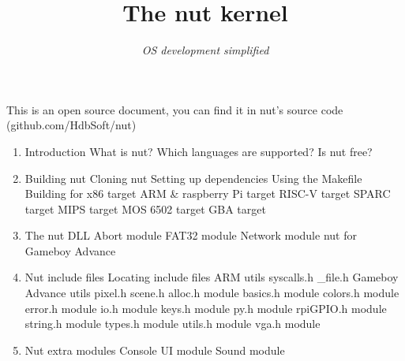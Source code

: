 \documentclass{article}
\title{The nut kernel}
\author{\textit{OS development simplified}}
\date{}
\begin{document}
  \maketitle
  \newpage
  \begin{center}
    This is an open source document, you can find it in nut's source code (github.com/HdbSoft/nut)
  \end{center}
  \newpage

  \begin{enumerate}
  	\Large \item Introduction
    \large \subitem What is nut?
    \large \subitem Which languages are supported?
    \large \subitem Is nut free?
  	\\
  	\Large \item Building nut
  	\large \subitem Cloning nut
    \large \subitem Setting up dependencies
    \large \subitem Using the Makefile
  	\large \subitem Building for x86 target
  	\large \subitem ARM \& raspberry Pi target
  	\large \subitem RISC-V target
  	\large \subitem SPARC target
  	\large \subitem MIPS target
  	\large \subitem MOS 6502 target
  	\large \subitem GBA target
    \\
  	\Large \item The nut DLL
  	\large \subitem Abort module
    \large \subitem FAT32 module
    \large \subitem Network module
    \large \subitem nut for Gameboy Advance
    \\
  	\Large \item Nut include files
    \large \subitem Locating include files
    \large \subitem ARM utils
    \normalsize \subitem \hspace{1cm} syscalls.h
    \normalsize \subitem \hspace{1cm} \_file.h
    \large \subitem Gameboy Advance utils
    \normalsize \subitem \hspace{1cm} pixel.h
    \normalsize \subitem \hspace{1cm} scene.h
    \large \subitem alloc.h module
    \large \subitem basics.h module
    \large \subitem colors.h module
    \large \subitem error.h module
    \large \subitem io.h module
    \large \subitem keys.h module
    \large \subitem py.h module
    \large \subitem rpiGPIO.h module
    \large \subitem string.h module
    \large \subitem types.h module
    \large \subitem utils.h module
    \large \subitem vga.h module
    \\
    \Large \item Nut extra modules
    \large \subitem Console UI module
    \large \subitem Sound module

\end{enumerate}
\end{document}
